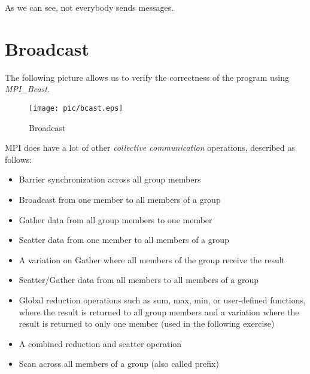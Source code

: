 As we can see, not everybody sends messages.

\section{Broadcast}

The following picture allows us to verify the correctness of the program using \textit{MPI\_Bcast}.
\begin{figure}[!h]
\begin{center}
	\texttt{[image: pic/bcast.eps]}
	\caption{Broadcast}
\end{center}
\end{figure}

MPI does have a lot of other \textit{collective communication} operations, described as follows:

\begin{itemize}
	\item Barrier synchronization across all group members
	\item Broadcast from one member to all members of a group
	\item Gather data from all group members to one member 
	\item Scatter data from one member to all members of a group
	\item A variation on Gather where all members of the group receive the result
	\item Scatter/Gather data from all members to all members of a group
	\item Global reduction operations such as sum, max, min, or user-defined functions, where the result is returned to all group members and a variation where the result is returned to only one member (used in the following exercise) 
	\item A combined reduction and scatter operation
	\item Scan across all members of a group (also called prefix)
\end{itemize}
